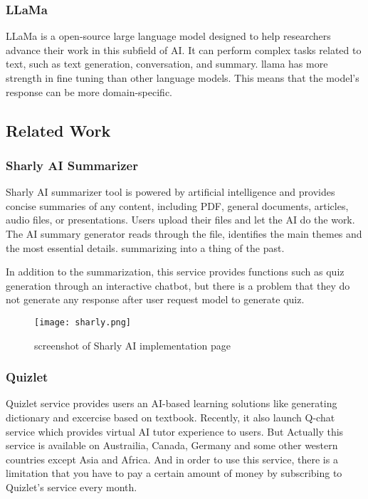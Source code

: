 \documentclass[runningheads]{llncs}
\begin{document}
\begin{spacing}{1.25}
\subsubsection{LLaMa} LLaMa is a open-source large language model designed to help researchers advance their work in this subfield of AI. It can perform complex tasks related to text, such as text generation, conversation, and summary. llama has more strength in fine tuning than other language models. This means that the model's response can be more domain-specific.

\subsection{Related Work}
\subsubsection{Sharly AI Summarizer} Sharly AI summarizer tool is powered by artificial intelligence and provides concise summaries of any content, including PDF, general documents, articles, audio files, or presentations. Users upload their files and let the AI do the work. The AI summary generator reads through the file, identifies the main themes and the most essential details. summarizing into a thing of the past.

In addition to the summarization, this service provides functions such as quiz generation through an interactive chatbot, but there is a problem that they do not generate any response after user request model to generate quiz.

\begin{figure}
\texttt{[image: sharly.png]}
\caption{screenshot of Sharly AI implementation page} \label{fig2}
\end{figure}

\subsubsection{Quizlet} Quizlet service provides users an AI-based learning solutions like generating dictionary and excercise based on textbook. Recently, it also launch Q-chat service which provides virtual AI tutor experience to users. But Actually this service is available on Austrailia, Canada, Germany and some other western countries except Asia and Africa. And in order to use this service, there is a limitation that you have to pay a certain amount of money by subscribing to Quizlet's service every month.


\end{spacing}
\end{document}
